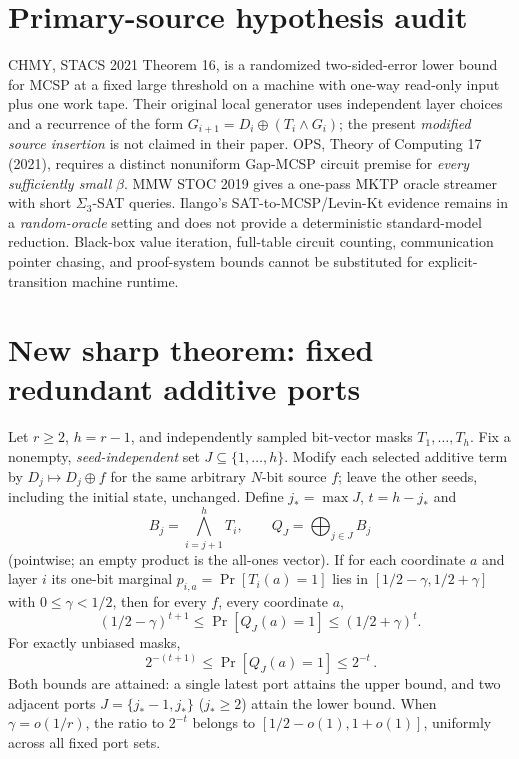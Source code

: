 \documentclass[11pt]{article}
\begin{document}
\section*{Primary-source hypothesis audit}
CHMY, STACS 2021 Theorem 16, is a randomized two-sided-error lower bound for MCSP at a fixed large threshold on a machine with one-way read-only input plus one work tape. Their original local generator uses independent layer choices and a recurrence of the form $G_{i+1}=D_i\oplus(T_i\wedge G_i)$; the present \emph{modified source insertion} is not claimed in their paper. OPS, Theory of Computing 17 (2021), requires a distinct nonuniform Gap-MCSP circuit premise for \emph{every sufficiently small} $\beta$. MMW STOC 2019 gives a one-pass MKTP oracle streamer with short $\Sigma_3$-SAT queries. Ilango's SAT-to-MCSP/Levin-Kt evidence remains in a \emph{random-oracle} setting and does not provide a deterministic standard-model reduction. Black-box value iteration, full-table circuit counting, communication pointer chasing, and proof-system bounds cannot be substituted for explicit-transition machine runtime.

\section*{New sharp theorem: fixed redundant additive ports}
Let $r\ge 2$, $h=r-1$, and independently sampled bit-vector masks $T_1,\ldots,T_h$. Fix a nonempty, \emph{seed-independent} set $J\subseteq\{1,\ldots,h\}$. Modify each selected additive term by $D_j\mapsto D_j\oplus f$ for the same arbitrary $N$-bit source $f$; leave the other seeds, including the initial state, unchanged. Define $j_*=\max J$, $t=h-j_*$ and
\[
 B_j=\bigwedge_{i=j+1}^{h}T_i,\qquad
 Q_J=\bigoplus_{j\in J} B_j
\]
(pointwise; an empty product is the all-ones vector). If for each coordinate $a$ and layer $i$ its one-bit marginal $p_{i,a}=\Pr[T_i(a)=1]$ lies in $[1/2-\gamma,1/2+\gamma]$ with $0\le\gamma<1/2$, then for every $f$, every coordinate $a$,
\begin{equation}
\label{eq:exposure}
(1/2-\gamma)^{t+1}
\le \Pr[Q_J(a)=1]
\le (1/2+\gamma)^t.
\end{equation}
For exactly unbiased masks,
\[
\boxed{\,2^{-(t+1)}\le\Pr[Q_J(a)=1]\le2^{-t}\,}.
\]
Both bounds are attained: a single latest port attains the upper bound, and two adjacent ports $J=\{j_*-1,j_*\}$ ($j_*\ge2$) attain the lower bound. When $\gamma=o(1/r)$, the ratio to $2^{-t}$ belongs to $[1/2-o(1),1+o(1)]$, uniformly across all fixed port sets.
\end{document}
